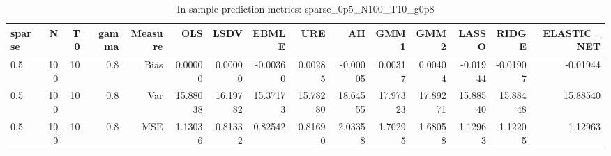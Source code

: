 \begin{table}[!htbp]\centering
\caption{In-sample prediction metrics: sparse_0p5_N100_T10_g0p8}
\label{tab:table2_sparse_0p5_N100_T10_g0p8}
\begin{tabular}{lrrrrrrrrrrrrrr}
\hline
sparse & N & T0 & gamma & Measure & OLS & LSDV & EBMLE & URE & AH & GMM1 & GMM2 & LASSO & RIDGE & ELASTIC_NET \\
\hline
0.5 & 100 & 10 & 0.8 & Bias & 0.00000 & 0.00000 & -0.00360 & 0.00285 & -0.00005 & 0.00317 & 0.00404 & -0.01944 & -0.01907 & -0.01944 \\
0.5 & 100 & 10 & 0.8 & Var & 15.88038 & 16.19782 & 15.37173 & 15.78280 & 18.64555 & 17.97323 & 17.89271 & 15.88540 & 15.88448 & 15.88540 \\
0.5 & 100 & 10 & 0.8 & MSE & 1.13036 & 0.81332 & 0.82542 & 0.81690 & 2.03358 & 1.70295 & 1.68058 & 1.12963 & 1.12205 & 1.12963 \\
\hline
\end{tabular}
\end{table}

